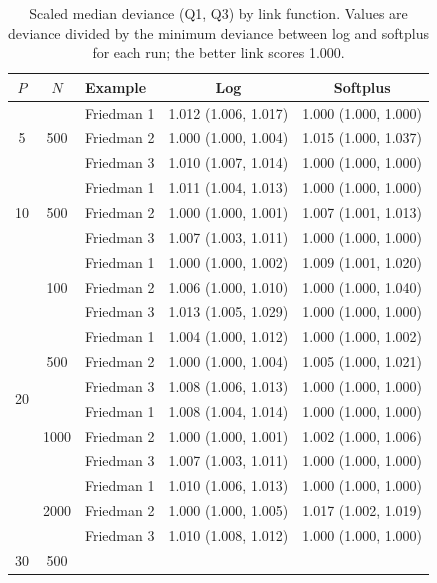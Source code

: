 \documentclass[12pt]{article}
\newcommand{\1}{\mathbb{I}}
\theoremstyle{plain}
\theoremstyle{definition}
\theoremstyle{remark}
\begin{document}
\begin{table}
\centering
\caption{Scaled median deviance (Q1, Q3) by link function. Values are deviance divided by the minimum deviance between log and softplus for each run; the better link scores 1.000.}
\label{tab:scaled_deviance}
\begin{tabular}{cclcc}
\toprule
$P$ & $N$ & Example & Log & Softplus \\
\midrule
\multirow{3}{*}{5} & \multirow{3}{*}{500}
  & Friedman 1 & 1.012 (1.006, 1.017) & 1.000 (1.000, 1.000) \\
& & Friedman 2 & 1.000 (1.000, 1.004) & 1.015 (1.000, 1.037) \\
& & Friedman 3 & 1.010 (1.007, 1.014) & 1.000 (1.000, 1.000) \\
\midrule
\multirow{3}{*}{10} & \multirow{3}{*}{500}
  & Friedman 1 & 1.011 (1.004, 1.013) & 1.000 (1.000, 1.000) \\
& & Friedman 2 & 1.000 (1.000, 1.001) & 1.007 (1.001, 1.013) \\
& & Friedman 3 & 1.007 (1.003, 1.011) & 1.000 (1.000, 1.000) \\
\midrule
\multirow{12}{*}{20}
  & \multirow{3}{*}{100}
    & Friedman 1 & 1.000 (1.000, 1.002) & 1.009 (1.001, 1.020) \\
& & Friedman 2 & 1.006 (1.000, 1.010) & 1.000 (1.000, 1.040) \\
& & Friedman 3 & 1.013 (1.005, 1.029) & 1.000 (1.000, 1.000) \\
\cmidrule{2-5}
  & \multirow{3}{*}{500}
    & Friedman 1 & 1.004 (1.000, 1.012) & 1.000 (1.000, 1.002) \\
& & Friedman 2 & 1.000 (1.000, 1.004) & 1.005 (1.000, 1.021) \\
& & Friedman 3 & 1.008 (1.006, 1.013) & 1.000 (1.000, 1.000) \\
\cmidrule{2-5}
  & \multirow{3}{*}{1000}
    & Friedman 1 & 1.008 (1.004, 1.014) & 1.000 (1.000, 1.000) \\
& & Friedman 2 & 1.000 (1.000, 1.001) & 1.002 (1.000, 1.006) \\
& & Friedman 3 & 1.007 (1.003, 1.011) & 1.000 (1.000, 1.000) \\
\cmidrule{2-5}
  & \multirow{3}{*}{2000}
    & Friedman 1 & 1.010 (1.006, 1.013) & 1.000 (1.000, 1.000) \\
& & Friedman 2 & 1.000 (1.000, 1.005) & 1.017 (1.002, 1.019) \\
& & Friedman 3 & 1.010 (1.008, 1.012) & 1.000 (1.000, 1.000) \\
\midrule
\multirow{3}{*}{30} & \multirow{3}{*}{500}

\end{tabular}
\end{table}
\end{document}
